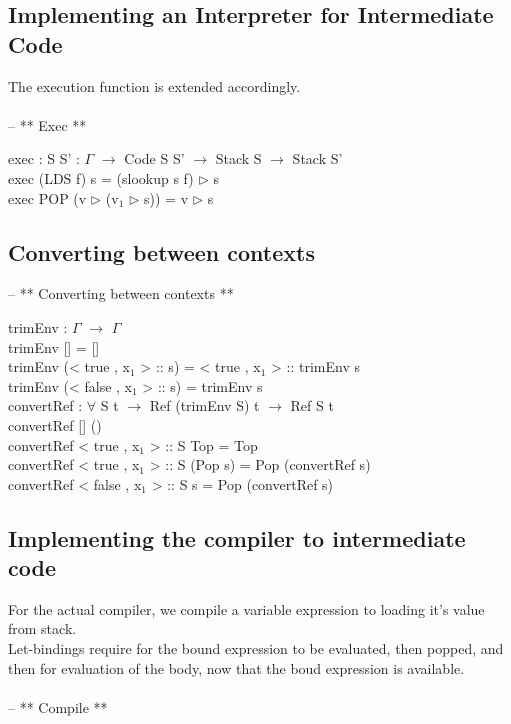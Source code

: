 \documentclass[paper=a4, fontsize=11pt]{scrartcl} %
\numberwithin{equation}{section} %
\numberwithin{figure}{section} %
\numberwithin{table}{section} %
\begin{document}
\subsection{Implementing an Interpreter for Intermediate Code}
The execution function is extended accordingly.\\
\\
\ttfamily
-- ** Exec **

exec : {S S' : $\Gamma$} $\rightarrow$ Code S S' $\rightarrow$ Stack S $\rightarrow$ Stack S'\\
exec (LDS f) s = (slookup s f) $\rhd$ s\\
exec POP (v $\rhd$ (v$_1$ $\rhd$ s)) = v $\rhd$ s\\
\normalfont
\subsection{Converting between contexts}

\ttfamily
-- ** Converting between contexts **

trimEnv : $\Gamma$ $\rightarrow$ $\Gamma$\\
trimEnv [] = []\\
trimEnv (< true , x$_1$ > :: s) = < true , x$_1$ > :: trimEnv s\\
trimEnv (< false , x$_1$ > :: s) = trimEnv s\\

convertRef : $\forall$ {S t} $\rightarrow$ Ref (trimEnv S) t $\rightarrow$ Ref S t\\
convertRef {[]} ()\\
convertRef {< true , x$_1$ > :: S} Top = Top\\
convertRef {< true , x$_1$ > :: S} (Pop s) = Pop (convertRef s)\\
convertRef {< false , x$_1$ > :: S} s = Pop (convertRef s)\\
\normalfont

\subsection{Implementing the compiler to intermediate code}
For the actual compiler, we compile a variable expression to loading it's value from stack.\\
Let-bindings require for the bound expression to be evaluated, then popped, and then for evaluation of the body, now that the boud expression is available.\\
\\
\ttfamily
-- ** Compile ** 
\end{document}
